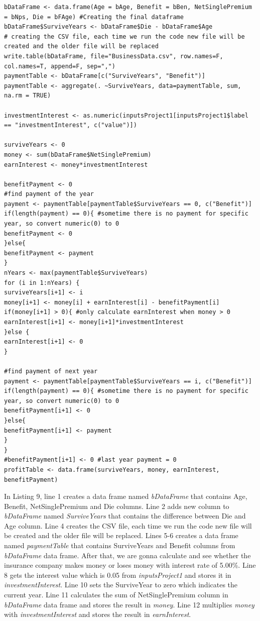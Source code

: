 \documentclass[12pt]{article}
\def\StartLineAtOne{\lstset{firstnumber=1}}
\begin{document}
\StartLineAtOne
\begin{lstlisting}[caption={ Business Data Frame},captionpos=b]
bDataFrame <- data.frame(Age = bAge, Benefit = bBen, NetSinglePremium = bNps, Die = bFAge) #Creating the final dataframe
bDataFrame$SurviveYears <- bDataFrame$Die - bDataFrame$Age
# creating the CSV file, each time we run the code new file will be created and the older file will be replaced 
write.table(bDataFrame, file="BusinessData.csv", row.names=F, col.names=T, append=F, sep=",")
paymentTable <- bDataFrame[c("SurviveYears", "Benefit")]
paymentTable <- aggregate(. ~SurviveYears, data=paymentTable, sum, na.rm = TRUE)

investmentInterest <- as.numeric(inputsProject1[inputsProject1$label == "investmentInterest", c("value")])

surviveYears <- 0
money <- sum(bDataFrame$NetSinglePremium)
earnInterest <- money*investmentInterest

benefitPayment <- 0
#find payment of the year
payment <- paymentTable[paymentTable$SurviveYears == 0, c("Benefit")] 
if(length(payment) == 0){ #sometime there is no payment for specific year, so convert numeric(0) to 0
benefitPayment <- 0
}else{
benefitPayment <- payment
} 
nYears <- max(paymentTable$SurviveYears)
for (i in 1:nYears) {
surviveYears[i+1] <- i
money[i+1] <- money[i] + earnInterest[i] - benefitPayment[i]
if(money[i+1] > 0){ #only calculate earnInterest when money > 0
earnInterest[i+1] <- money[i+1]*investmentInterest
}else {
earnInterest[i+1] <- 0
}

#find payment of next year
payment <- paymentTable[paymentTable$SurviveYears == i, c("Benefit")] 
if(length(payment) == 0){ #sometime there is no payment for specific year, so convert numeric(0) to 0
benefitPayment[i+1] <- 0
}else{
benefitPayment[i+1] <- payment
}
}
#benefitPayment[i+1] <- 0 #last year payment = 0
profitTable <- data.frame(surviveYears, money, earnInterest, benefitPayment)
\end{lstlisting}
In Listing 9, line 1 creates a data frame named \textit{bDataFrame} that contains Age, Benefit, NetSinglePremium and Die columns. Line 2 adds new column to \textit{bDataFrame}  named  \textit{SurviveYears} that contains the difference between Die and Age column. Line 4 creates the CSV file, each time we run the code new file will be created and the older file will be replaced. Lines 5-6 creates a data frame named \textit{paymentTable} that contains SurviveYears and Benefit columns from \textit{bDataFrame} data frame. After that, we are gonna calculate and see whether the insurance company makes money or loses money with interest rate of 5.00\%. Line 8 gets the interest value which is 0.05 from \textit{inputsProject1} and stores it in \textit{investmentInterest}. Line 10 sets the SurviveYear to zero which indicates the current year. Line 11 calculates the sum of NetSinglePremium column in \textit{bDataFrame} data frame and stores the result in \textit{money}. Line 12 multiplies \textit{money} with \textit{investmentInterest} and stores the result in \textit{earnInterest}.
\end{document}
